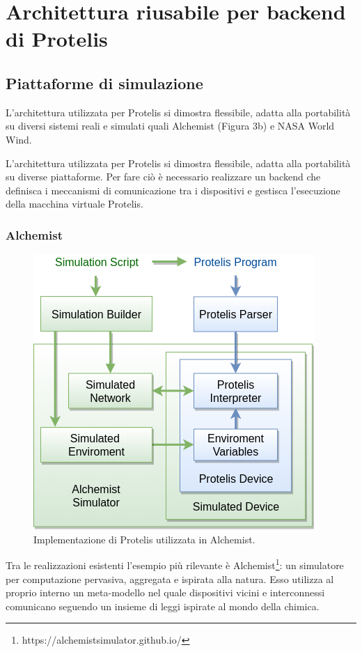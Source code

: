 \chapter{Architettura riusabile per backend di Protelis}
\section{Piattaforme di simulazione}
L'architettura utilizzata per Protelis si dimostra flessibile, adatta alla
portabilità su diversi sistemi reali\cite{Clark2015} e simulati quali
Alchemist\cite{alchemist} (Figura 3b) e NASA World Wind\cite{Bell2007}.

L'architettura utilizzata per Protelis si dimostra flessibile, adatta alla
portabilità su diverse piattaforme. Per fare ciò è necessario realizzare un
backend che definisca i meccanismi di comunicazione tra i dispositivi e
gestisca l'esecuzione della macchina virtuale Protelis.

\subsection{Alchemist}
\begin{figure}
  \centering
  \includegraphics[width=0.7\linewidth]{images/alchemist-architecture.png}
  \caption{Implementazione di Protelis utilizzata in Alchemist.}
\end{figure}
Tra le realizzazioni esistenti l'esempio più rilevante è
Alchemist\footnote{https://alchemistsimulator.github.io/}: un simulatore per
computazione pervasiva, aggregata e ispirata alla natura. Esso utilizza al
proprio interno un meta-modello nel quale dispositivi vicini e interconnessi
comunicano seguendo un insieme di leggi ispirate al mondo della chimica.


